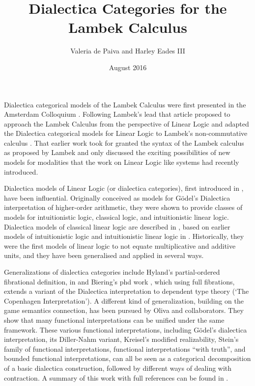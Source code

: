 \documentclass{article}
\title{Dialectica Categories for the Lambek Calculus}
\author{Valeria de Paiva and Harley Eades III}
\date{August 2016}
\begin{document}
\maketitle
  Dialectica categorical models of the Lambek Calculus were first presented in the Amsterdam Colloquium \cite{depaiva1991}. Following Lambek's lead that article proposed to approach the
Lambek Calculus from the perspective of Linear Logic and adapted the Dialectica categorical models for Linear Logic to Lambek's non-commutative calculus \cite{lambek1988}. That earlier work took for granted the syntax of the Lambek calculus 
as proposed by Lambek and only discussed the exciting possibilities of new models for modalities that the work on Linear Logic like systems had recently introduced.

\iffalse
Dialectica models of Linear Logic (or dialectica categories), first introduced in \cite{depaiva1989}, have been influential. Originally conceived as models for G\"odel's Dialectica interpretation of higher-order arithmetic, they were shown to provide  classes of models for intuitionistic logic, classical logic, and intuitionistic linear logic. Dialectica models
of classical linear logic are described in \cite{depaiva1990}, based on earlier models of intuitionistic logic
and intuitionistic linear logic in \cite{depaiva1989}. Historically, they were the first models of linear logic to not equate multiplicative and additive units, and they have been generalised and applied in several ways. 

Generalizations of dialectica categories include Hyland's partial-ordered fibrational definition, in  \cite{hyland2002} and Biering's phd work \cite{biering2008}, which using full fibrations, extends a variant of the Dialectica interpretation to dependent type theory (`The Copenhagen Interpretation'). A different kind of generalization, building on the game semantics connection, has been pursued by Oliva and collaborators. They show that many functional interpretations can be unified under the same framework. These  various functional interpretations, including G\"odel’s dialectica interpretation, its Diller-Nahm variant, Kreisel's modified realizability, Stein’s family of functional interpretations, functional interpretations “with truth”, and bounded functional interpretations, can all be seen as a categorical decomposition of a basic dialectica construction, followed by different ways of dealing with contraction. A summary of this work with full references can be found in \cite{oliva2014}.
\end{document}
